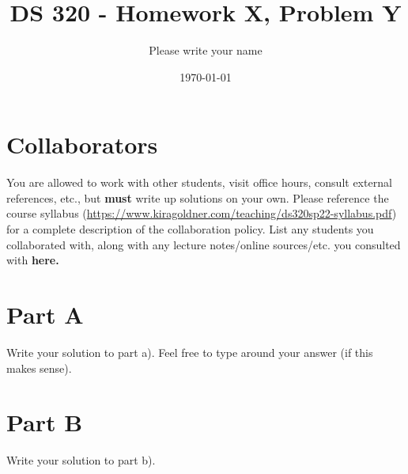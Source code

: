 \documentclass[12pt]{article}%
\begin{document}
\title{DS 320 - Homework X, Problem Y} %
\author{Please write your name} %
\date{\today}
\maketitle
\section*{Collaborators}
You are allowed to work with other students, visit office hours, consult external references, etc., but \textbf{must} write up solutions on your own.  Please reference the course syllabus (\url{https://www.kiragoldner.com/teaching/ds320sp22-syllabus.pdf}) for a complete description of the collaboration policy. List any students you collaborated with, along with any lecture notes/online sources/etc. you consulted with \textbf{here.}

\section*{Part A}
Write your solution to part a). Feel free to type  around your answer (if this makes sense).
\section*{Part B}
Write your solution to part b).
\end{document}
